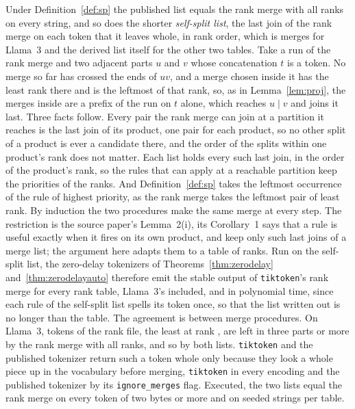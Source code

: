 \documentclass[11pt,a4paper]{article}
\theoremstyle{definition}
\theoremstyle{plain}
\newcommand{\code}[1]{\texttt{#1}}
\begin{document}
Under Definition~\ref{def:sp} the published list equals the rank merge with all ranks on every string, and so does the
shorter \emph{self-split list}, the last join of the rank merge on each token that it leaves whole, in rank order, which
is \LlamaSelfSplit{} merges for Llama~3 and the derived list itself for the other two tables. Take a run of the rank
merge and two adjacent parts \(u\) and \(v\) whose concatenation \(t\) is a token. No merge so far has crossed the ends
of \(uv\), and a merge chosen inside it has the least rank there and is the leftmost of that rank, so, as in
Lemma~\ref{lem:proj}, the merges inside are a prefix of the run on \(t\) alone, which reaches \(u \mid v\) and joins it
last. Three facts follow. Every pair the rank merge can join at a partition it reaches is the last join of its product,
one pair for each product, so no other split of a product is ever a candidate there, and the order of the splits within
one product's rank does not matter. Each list holds every such last join, in the order of the product's rank, so the
rules that can apply at a reachable partition keep the priorities of the ranks. And Definition~\ref{def:sp} takes the
leftmost occurrence of the rule of highest priority, as the rank merge takes the leftmost pair of least rank. By
induction the two procedures make the same merge at every step. The restriction is the source paper's Lemma~2(i), its
Corollary~1 says that a rule is useful exactly when it fires on its own product, and \citet[Appendices~A.2
and~C]{jiang2026incremental} keep only such last joins of a merge list; the argument here adapts them to a table of
ranks. Run on the self-split list, the zero-delay tokenizers of Theorems~\ref{thm:zerodelay} and~\ref{thm:zerodelayauto}
therefore emit the stable output of \code{tiktoken}'s rank merge for every rank table, Llama~3's included, and in
polynomial time, since each rule of the self-split list spells its token once, so that the list written out is no longer
than the table. The agreement is between merge procedures. On Llama~3, \LlamaNotWhole{} tokens of the rank file, the
least at rank \LlamaNotWholeLeast{}, are left in three parts or more by the rank merge with all ranks, and so by both
lists. \code{tiktoken} and the published tokenizer return such a token whole only because they look a whole piece up in
the vocabulary before merging, \code{tiktoken} in every encoding and the published tokenizer by its
\code{ignore\_merges} flag. Executed, the two lists equal the rank merge on every token of two bytes or more and on
\VocabSeededStrings{} seeded strings per table.
\end{document}

